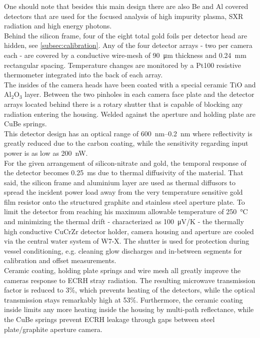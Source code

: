 \documentclass[
    aps,%
    twocolumn,%
    secnumarabic,%
    amssymb,%
    prd,%
    10pt%
    ]{revtex4-1}
\begin{document}
        One should note that besides this main design there are also Be and Al covered detectors that are used for the focused analysis of high impurity plasma, SXR radiation and high energy photons.\\%
        Behind the silicon frame, four of the eight total gold foils per detector head are hidden, see \cref{subsec:calibration}. Any of the four detector arrays - two per camera each - are covered by a conductive wire-mesh of \mbox{\SI{90}{\micro\meter}} thickness and \mbox{\SI{0.24}{\milli\meter}} rectangular spacing. Temperature changes are monitored by a Pt100 resistive thermometer integrated into the back of each array.\\%
        The insides of the camera heads have been coated with a special ceramic TiO and \mbox{Al$_{2}$O$_{3}$} layer. Between the two pinholes in each camera face plate and the detector arrays located behind there is a rotary shutter that is capable of blocking any radiation entering the housing. Welded against the aperture and holding plate are CuBe springs.\\%
        This detector design has an optical range of \mbox{\SIrange{600}{0.2}{\nano\meter}} where reflectivity is greatly reduced due to the carbon coating, while the sensitivity regarding input power is as low as \mbox{\SI{200}{\nano\watt}}.\\%
        For the given arrangement of silicon-nitrate and gold, the temporal response of the detector becomes \mbox{\SI{0.25}{\milli\second}} due to thermal diffusivity of the material. That said, the silicon frame and aluminium layer are used as thermal diffusors to spread the incident power load away from the very temperature sensitive gold film resistor onto the structured graphite and stainless steel aperture plate. To limit the detector from reaching his maximum allowable temperature of \mbox{\SI{250}{\celsius}} and minimizing the thermal drift - characterized as \mbox{\SI{100}{\micro\volt/\kelvin}} - the thermally high conductive CuCrZr detector holder, camera housing and aperture are cooled via the central water system of W7-X. The shutter is used for protection during vessel conditioning, e.g. cleaning glow discharges and in-between segments for calibration and offset measurements.\\%
        Ceramic coating, holding plate springs and wire mesh all greatly improve the cameras response to ECRH stray radiation. The resulting microwave transmission factor is reduced to 3\%, which prevents heating of the detectors, while the optical transmission stays remarkably high at 53\%. Furthermore, the ceramic coating inside limits any more heating inside the housing by multi-path reflectance, while the CuBe springs prevent ECRH leakage through gaps between steel plate/graphite aperture camera.
\end{document}
